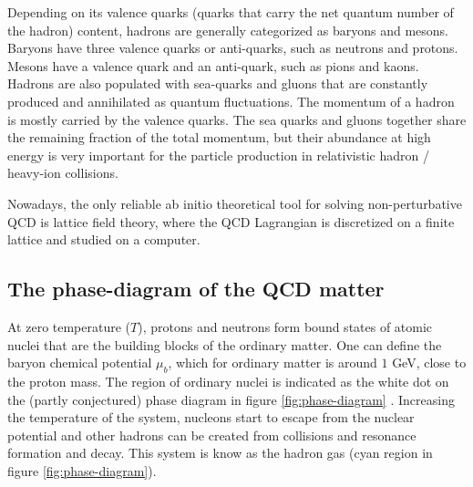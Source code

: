 Depending on its valence quarks (quarks that carry the net quantum number of the hadron) content, hadrons are generally categorized as baryons and mesons.
Baryons have three valence quarks or anti-quarks, such as neutrons and protons.
Mesons have a valence quark and an anti-quark, such as pions and kaons.
Hadrons are also populated with sea-quarks and gluons that are constantly produced and annihilated as quantum fluctuations.
The momentum of a hadron is mostly carried by the valence quarks.
The sea quarks and gluons together share the remaining fraction of the total momentum, but their abundance at high energy is very important for the particle production in relativistic hadron / heavy-ion collisions.

Nowadays, the only reliable ab initio theoretical tool for solving non-perturbative QCD is lattice field theory, where the QCD Lagrangian is discretized on a finite lattice and studied on a computer.

\subsection{The phase-diagram of the QCD matter}
At zero temperature ($T$), protons and neutrons form bound states of atomic nuclei that are the building blocks of the ordinary matter.
One can define the baryon chemical potential $\mu_b$, which for ordinary matter is around $1$ GeV, close to the proton mass.
The region of ordinary nuclei is indicated as the white dot on the (partly conjectured) phase diagram in figure \ref{fig:phase-diagram} \cite{Geesaman:2015fha}.
Increasing the temperature of the system, nucleons start to escape from the nuclear potential and other hadrons can be created from collisions and resonance formation and decay.
This system is know as the hadron gas (cyan region in figure \ref{fig:phase-diagram}).

